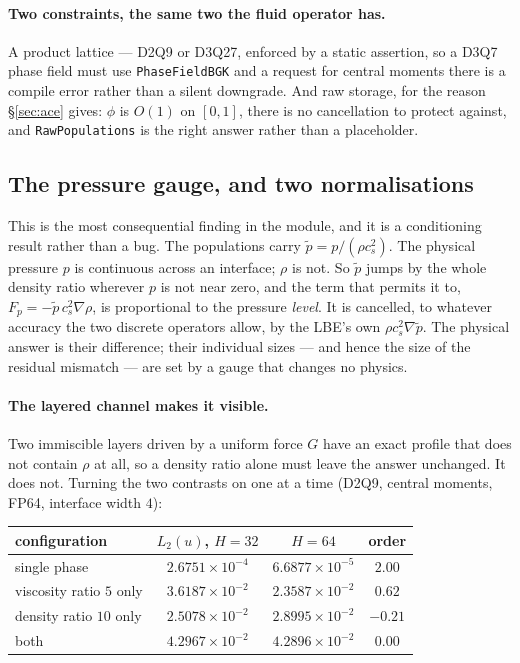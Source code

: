 \documentclass[11pt,a4paper]{article}
\newcommand{\code}[1]{\texttt{\small #1}}
\newcommand{\cs}{c_s}
\newcommand{\e}[1]{\times 10^{#1}}
\begin{document}
\paragraph{Two constraints, the same two the fluid operator has.} A product
lattice --- D2Q9 or D3Q27, enforced by a static assertion, so a D3Q7 phase field
must use \code{PhaseFieldBGK} and a request for central moments there is a compile
error rather than a silent downgrade. And raw storage, for the reason
\S\ref{sec:ace} gives: $\phi$ is $O(1)$ on $[0,1]$, there is no cancellation to
protect against, and \code{RawPopulations} is the right answer rather than a
placeholder.

\subsection{The pressure gauge, and two normalisations}\label{sec:gauge}

This is the most consequential finding in the module, and it is a conditioning
result rather than a bug. The populations carry $\tilde p = p/(\rho\cs^2)$. The
physical pressure $p$ is continuous across an interface; $\rho$ is not. So
$\tilde p$ jumps by the whole density ratio wherever $p$ is not near zero, and the
term that permits it to, $F_p=-\tilde p\,\cs^2\nabla\rho$, is proportional to the
pressure \emph{level}. It is cancelled, to whatever accuracy the two discrete
operators allow, by the LBE's own $\rho\cs^2\nabla\tilde p$. The physical answer is
their difference; their individual sizes --- and hence the size of the residual
mismatch --- are set by a gauge that changes no physics.

\paragraph{The layered channel makes it visible.} Two immiscible layers driven by
a uniform force $G$ have an exact profile that does not contain $\rho$ at all, so
a density ratio alone must leave the answer unchanged. It does not. Turning the
two contrasts on one at a time (D2Q9, central moments, FP64, interface width $4$):

\begin{center}\small
\begin{tabular}{lccc}
\toprule
configuration & $L_2(u)$, $H{=}32$ & $H{=}64$ & order \\
\midrule
single phase              & $2.6751\e{-4}$ & $6.6877\e{-5}$ & $2.00$ \\
viscosity ratio $5$ only  & $3.6187\e{-2}$ & $2.3587\e{-2}$ & $0.62$ \\
density ratio $10$ only   & $2.5078\e{-2}$ & $2.8995\e{-2}$ & $-0.21$ \\
both                      & $4.2967\e{-2}$ & $4.2896\e{-2}$ & $0.00$ \\
\bottomrule
\end{tabular}
\end{center}
\end{document}
